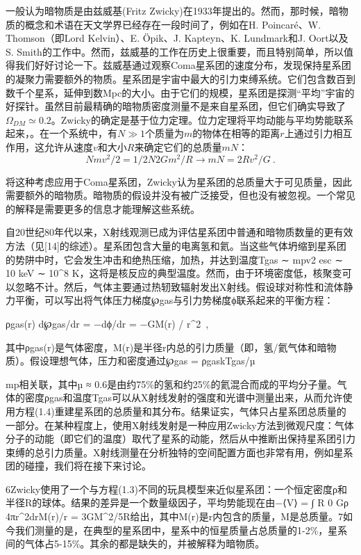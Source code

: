 

一般认为暗物质是由兹威基(Fritz Zwicky)在1933年提出的。然而，那时候，暗物质的概念和术语在天文学界已经存在一段时间了，例如在H. Poincaré、W. Thomson（即Lord Kelvin）、E. Öpik、J. Kapteyn、K. Lundmark和J. Oort以及S. Smith的工作中。然而，兹威基的工作在历史上很重要，而且特别简单，所以值得我们好好讨论一下。兹威基通过观察Coma星系团的速度分布，发现保持星系团的凝聚力需要额外的物质。星系团是宇宙中最大的引力束缚系统。它们包含数百到数千个星系，延伸到数Mpc的大小。由于它们的规模，星系团是探测“平均”宇宙的好探针。虽然目前最精确的暗物质密度测量不是来自星系团，但它们确实导致了$\Omega_{DM} \simeq 0.2$。Zwicky的确定是基于位力定理。位力定理将平均动能与平均势能联系起来，。在一个系统中，有$N \gg 1$个质量为$m$的物体在相等的距离$r$上通过引力相互作用，这允许从速度$v$和大小$R$来确定它们的总质量$mN$：
\begin{equation}
N mv^2 / 2 = 1/2 N2 G m^2 / R \rightarrow mN = 2R v^2 / G  ~.
\end{equation}


将这种考虑应用于Coma星系团，Zwicky认为星系团的总质量大于可见质量，因此需要额外的暗物质。暗物质的假设并没有被广泛接受，但也没有被忽视。一个常见的解释是需要更多的信息才能理解这些系统。

自20世纪80年代以来，X射线观测已成为评估星系团中普通和暗物质数量的更有效方法（见[14]的综述）。星系团包含大量的电离氢和氦。当这些气体坍缩到星系团的势阱中时，它会发生冲击和绝热压缩，加热，并达到温度Tgas ∼ mpv2 esc ∼ 10 keV ∼ 10^8 K，这将是核反应的典型温度。然而，由于环境密度低，核聚变可以忽略不计。然后，气体主要通过热轫致辐射发出X射线。假设球对称性和流体静力平衡，可以写出将气体压力梯度℘gas与引力势梯度ϕ联系起来的平衡方程：

ρgas(r) d℘gas/dr = −dϕ/dr = −GM(r) / r^2~,  

其中ρgas(r)是气体密度，M(r)是半径r内总的引力质量（即，氢/氦气体和暗物质）。假设理想气体，压力和密度通过℘gas = ρgaskTgas/µ

mp相关联，其中µ ≈ 0.6是由约75\%的氢和约25\%的氦混合而成的平均分子量。气体的密度ρgas和温度Tgas可以从X射线发射的强度和光谱中测量出来，从而允许使用方程(1.4)重建星系团的总质量和其分布。结果证实，气体只占星系团总质量的一部分。在某种程度上，使用X射线发射是一种应用Zwicky方法到微观尺度：气体分子的动能（即它们的温度）取代了星系的动能，然后从中推断出保持星系团引力束缚的总引力质量。X射线测量在分析独特的空间配置方面也非常有用，例如星系团的碰撞，我们将在接下来讨论。

6Zwicky使用了一个与方程(1.3)不同的玩具模型来近似星系团：一个恒定密度ρ和半径R的球体。结果的差异是一个数量级因子，平均势能现在由−⟨V⟩ = ∫ R 0 Gρ 4πr^2drM(r)/r = 3GM^2/5R给出，其中M(r)是r内包含的质量，M是总质量。7如今我们测量的是，在典型的星系团中，星系中的恒星质量占总质量的1-2\%，星系间的气体占5-15\%。其余的都是缺失的，并被解释为暗物质。